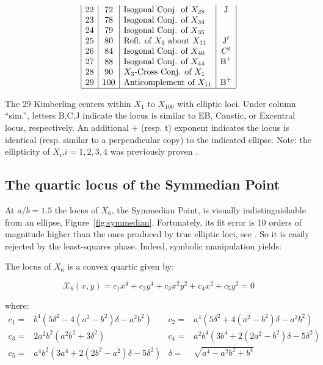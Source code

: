 \begin{table}
\begin{minipage}[t]{.475\linewidth}
$$\begin{array}{|c|c|l|c|}
 22 & {72} & \text{Isogonal Conj. of $X_{28}$} & \text{J}\\
 23 & {78} & \text{Isogonal Conj. of $X_{34}$} & \\
 24 & {79} & \text{Isogonal Conj. of $X_{35}$} & \\
 25 & {80} & \text{Refl. of $X_1$ about $X_{11}$} &  \text{J}^t \\
 26 & {84} & \text{Isogonal Conj. of $X_{40}$} & C^t \\
 27 & {88} & \text{Isogonal Conj. of $X_{44}$} &  \text{B}^+ \\
 28 & {90} & \text{$X_{3}$-Cross Conj. of $X_{1}$} & \\
 29 & {100} & \text{Anticomplement of $X_{11}$} & \text{B}^+\\
 \hline
 \end{array}
 $$
\end{minipage}
\caption{The 29 Kimberling centers within $X_1$ to $X_{100}$ with elliptic loci. Under column ``sim.'', letters B,C,J indicate the locus is similar to EB, Caustic, or Excentral locus, respectively. An additional {+}  (resp. {t}) exponent indicates the locus is identical (resp. similar to a perpendicular copy) to the indicated ellipse. Note: the ellipticity of  $X_i$,$i=1,2,3,4$ was previously proven \cite{olga14,sergei2016proj,corentin19,garcia2019-incenter}.}
\label{tab:ell}
\end{table}

\subsection{The quartic locus of the Symmedian Point}
\label{sec:symmedian}

At $a/b=1.5$ the locus of $X_6$, the Symmedian Point, is visually indistinguishable from an ellipse, Figure~\ref{fig:symmedian}. Fortunately, its fit error is 10 orders of magnitude higher than the ones produced by true elliptic loci, see \cite[Part II]{garcia2021-ellipses-web}. So it is easily rejected by the least-squares phase. Indeed, symbolic manipulation yields:

\begin{theorem}
 The locus of $X_6$ is a convex quartic given by:

\begin{equation*}
  \mathcal{X}_6(x,y)=c_1 x^4+c_2 y^4+c_3 x^2 y^2+ c_4 x^2 + c_5 y^2 = 0
\end{equation*}

\noindent where:
$$
\begin{array}{rlrl}
c_1=&b^4(5\delta^2-4(a^2-b^2)\delta -a^2 b^2)&c_2=&a^4(5\delta^2+4(a^2-b^2)\delta-a^2b^2) \\
c_3=&2a^2 b^2(a^2 b^2+3\delta^2)&c_4=&a^2 b^4(3 b^4+2(2 a^2-b^2)\delta-5\delta^2)\\
c_5=&a^4 b^2(3 a^4+2(2 b^2-a^2)\delta-5\delta^2)&\delta=&\sqrt{a^4-a^2 b^2+b^4}
\end{array}
$$
\end{theorem}

